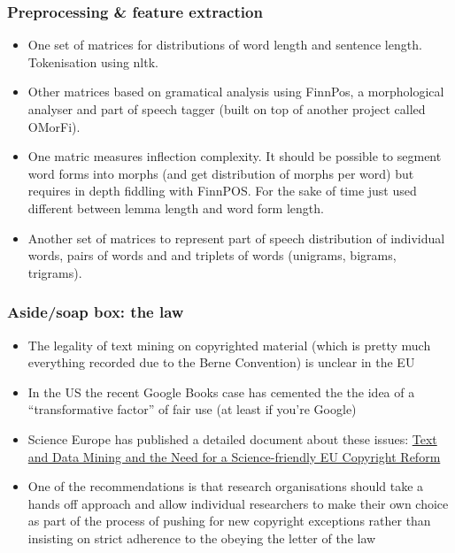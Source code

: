 \documentclass{beamer}
\begin{document}
\begin{frame}
  \frametitle{Preprocessing \& feature extraction}
  \begin{itemize}
    \item One set of matrices for distributions of word length and sentence
      length. Tokenisation using nltk.

    \item Other matrices based on gramatical analysis using FinnPos, a
      morphological analyser and part of speech tagger (built on top of another
      project called OMorFi).

    \item One matric measures inflection complexity. It should be possible to
      segment word forms into morphs (and get distribution of morphs per word)
      but requires in depth fiddling with FinnPOS. For the sake of time just
      used different between lemma length and word form length.

    \item Another set of matrices to represent part of speech distribution of
      individual words, pairs of words and and triplets of words (unigrams,
      bigrams, trigrams).
  \end{itemize}
\end{frame}

\begin{frame}
  \frametitle{Aside/soap box: the law}
  \begin{itemize}
    \item The legality of text mining on copyrighted material (which is pretty
      much everything recorded due to the Berne Convention) is unclear in the
      EU\pause{}

    \item In the US the recent Google Books case has cemented the the idea of a
      ``transformative factor'' of fair use (at least if you're Google)\pause{}

    \item Science Europe has published a detailed document about these issues:
      \href{http://www.scienceeurope.org/uploads/PublicDocumentsAndSpeeches/WGs_docs/SE_Briefing_Paper_textand_Data_web.pdf}%
      {Text and Data Mining and the Need for a Science-friendly EU Copyright Reform}\pause{}

    \item One of the recommendations is that research organisations should take a
      hands off approach and allow individual researchers to make their own
      choice as part of the process of pushing for new copyright exceptions
      rather than insisting on strict adherence to the obeying the letter of the
      law
  \end{itemize}
\end{frame}
\end{document}
